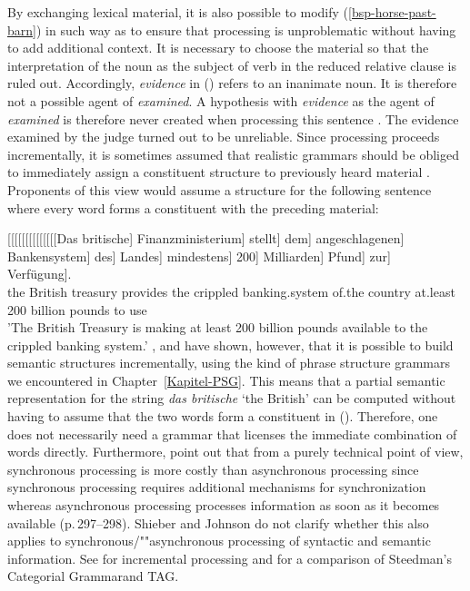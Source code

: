 \noindent
By exchanging lexical material, it is also possible to modify (\ref{bsp-horse-past-barn}) in such way as to
ensure that processing is unproblematic without having to add additional context. It is necessary
to choose the material so that the interpretation of the noun as the subject of verb in the reduced
relative clause is ruled out. Accordingly, \emph{evidence} in () refers to an inanimate noun.
It is therefore not a possible agent of \emph{examined}. A hypothesis with \emph{evidence} as the
agent of \emph{examined} is therefore never created when processing this sentence
\citep{SW2011a}.
\ea
The evidence examined by the judge turned out to be unreliable.
\z
Since processing proceeds incrementally, it is sometimes assumed that realistic grammars should be obliged to immediately assign a constituent structure to previously heard
material \citep{AS82a,Hausser92a-u}.
Proponents of this view would assume a structure for the following sentence where every word forms a constituent with the
preceding material:

\ea
\gll {}[[[[[[[[[[[[[[Das britische] Finanzministerium] stellt] dem] angeschlagenen] Bankensystem] des] Landes] mindestens] 200] Milliarden] Pfund] zur]~~~~~~~~~ Verfügung].\\
{}\spacebr{}\spacebr{}\spacebr{}\spacebr{}\spacebr{}\spacebr{}\spacebr{}\spacebr{}\spacebr{}\spacebr{}\spacebr{}\spacebr{}\spacebr{}\spacebr{}the British treasury provides the
crippled banking.system of.the country at.least 200 billion pounds to use\\
\glt 'The British Treasury is making at least 200 billion pounds available to the crippled banking system.'
\z
\citet{Pulman85a}, \citet{Stabler91a} and \citet[--308]{SJ93a} have shown, however, that it is possible to build semantic structures incrementally,
using the kind of phrase structure grammars we encountered in Chapter~\ref{Kapitel-PSG}. This means that a partial semantic representation for the
string \emph{das britische} `the British' can be computed without having to assume that the two words form a constituent in ().
Therefore, one does not necessarily need a grammar that licenses the immediate combination of words directly.
Furthermore,  point out that from a purely technical point of view, synchronous processing is more costly than asynchronous processing since
synchronous processing requires additional mechanisms for synchronization whereas asynchronous processing processes information as soon as it
becomes available (p.\,297--298). Shieber and Johnson do not clarify whether this also applies to synchronous/""asynchronous processing of syntactic and semantic
information. See  for incremental processing and for a comparison of Steedman's Categorial Grammar\indexcg and TAG\indextag.

